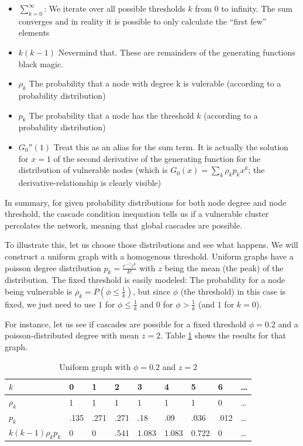 \documentclass{sig-alternate-05-2015}
\begin{document}
\begin{itemize}
  \item $\sum_{k=0}^\infty$: We iterate over all possible thresholds $k$ from $0$ to infinity. The sum converges and in reality it is possible to only calculate the ``first few'' elements
  \item $k (k-1)$ Nevermind that. These are remainders of the generating functions black magic.
  \item $\rho_k$ The probability that a node with degree k is vulerable (according to a probability distribution)
  \item $p_k$ The probability that a node has the threshold $k$ (according to a probability distribution)
  \item $G_0''(1)$ Treat this as an alias for the sum term. It is actually the solution for $x = 1$ of the second derivative of the generating function for the distribution of vulnerable nodes (which is $G_0(x) = \sum_k \rho_kp_kx^k$; the derivative-relationship is clearly visible)
\end{itemize}

In summary, for given probability distributions for both node degree and node threshold, the cascade condition inequation tells us if a vulnerable cluster percolates the network, meaning that global cascades are possible.

To illustrate this, let us choose those distributions and see what happens. We will construct a uniform graph with a homogenous threshold. Uniform graphs have a poisson degree distribution $p_k = \frac{e^{-z}z^k}{k!}$ with $z$ being the mean (the peak) of the distribution. The fixed threshold is easily modeled: The probability for a node being vulnerable is $\rho_k = P(\phi \leq \frac{1}{k})$, but since $\phi$ (the threshold) in this case is fixed, we just need to use $1$ for $\phi \leq \frac{1}{k}$ and $0$ for $\phi > \frac{1}{k}$ (and $1$ for $k = 0$).

For instance, let us see if cascades are possible for a fixed threshold $\phi = 0.2$ and a poisson-distributed degree with mean $z = 2$. Table \ref{tab:z2} shows the results for that graph.

\begin{table}[t!]
\centering
\caption{Uniform graph with $\phi = 0.2$ and $z = 2$}
\label{tab:z2}
\begin{tabular}{|l|l|l|l|l|l|l|l|l|}
\hline
$k$                       & 0     & 1      & 2     & 3      & 4      & 5      & 6     & \ldots\\ \hline
$\rho_k$                  & 1     & 1      & 1     & 1      & 1      & 1      & 0     & \ldots\\ \hline
$p_k$                     & .135  & .271   & .271  & .18    & .09    & .036   & .012  & \ldots\\ \hline
$k (k-1) \rho_k p_k$      & 0     & 0      & .541  & 1.083  & 1.083  & 0.722  & 0     & \ldots\\ \hline
\end{tabular}
\end{table}
\end{document}
